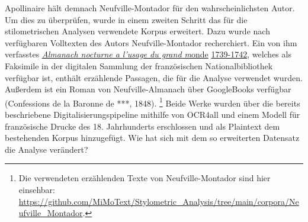 \documentclass[
  12pt,
  letterpaper,
  DIV=11,
  numbers=noendperiod]{scrreprt}
\begin{document}
Apollinaire hält demnach Neufville-Montador für den wahrscheinlichsten
Autor. Um dies zu überprüfen, wurde in einem zweiten Schritt das für die
stilometrischen Analysen verwendete Korpus erweitert. Dazu wurde nach
verfügbaren Volltexten des Autors Neufville-Montador recherchiert. Ein
von ihm verfasstes
\href{https://gallica.bnf.fr/services/engine/search/sru?operation=searchRetrieve&version=1.2&collapsing=disabled&query=\%28gallica\%20all\%20\%22neufville-montador\%22\%29\%20and\%20arkPress\%20all\%20\%22cb46635638h_date\%22&rk=64378;0}{\emph{Almanach
nocturne a l'usage du grand m}onde}
\href{https://gallica.bnf.fr/services/engine/search/sru?operation=searchRetrieve&version=1.2&collapsing=disabled&query=\%28gallica\%20all\%20\%22neufville-montador\%22\%29\%20and\%20arkPress\%20all\%20\%22cb46635638h_date\%22&rk=64378;0}{1739-1742},
welches als Faksimile in der digitalen Sammlung der französischen
Nationalbibliothek verfügbar ist, enthält erzählende Passagen, die für
die Analyse verwendet wurden. Außerdem ist ein Roman von
Neufville-Almanach über GoogleBooks verfügbar (Confessions de la Baronne
de ***, 1848). \footnote{Die verwendeten erzählenden Texte von
  Neufville-Montador sind hier einsehbar:
  \url{https://github.com/MiMoText/Stylometric_Analysis/tree/main/corpora/Neufville_Montador}.}
Beide Werke wurden über die bereits beschriebene
Digitalisierungspipeline mithilfe von OCR4all und einem Modell für
französische Drucke des 18. Jahrhunderts erschlossen und als Plaintext
dem bestehenden Korpus hinzugefügt. Wie hat sich mit dem so erweiterten
Datensatz die Analyse verändert?
\end{document}
